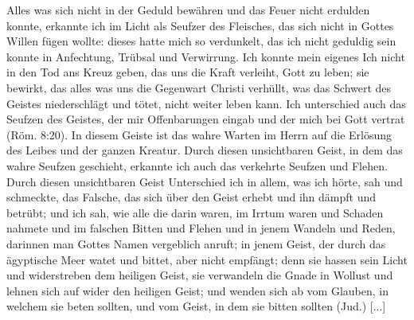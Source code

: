 Alles was sich nicht in der Geduld bewähren und das Feuer
nicht erdulden konnte, erkannte ich im Licht als Seufzer des
Fleisches, das sich nicht in Gottes Willen fügen wollte: dieses
hatte mich so verdunkelt, das ich nicht geduldig sein konnte in
Anfechtung, Trübsal und Verwirrung. Ich konnte mein eigenes
Ich nicht in den Tod ans Kreuz geben, das uns die Kraft
verleiht, Gott zu leben; sie bewirkt, das alles was uns
die Gegenwart Christi verhüllt, was das Schwert des Geistes
niederschlägt und tötet, nicht weiter leben kann. Ich 
unterschied auch das Seufzen des Geistes, der mir Offenbarungen
eingab und der mich bei Gott vertrat 
(Röm. 8:20). In diesem
Geiste ist das wahre Warten im Herrn 
auf die Erlösung des
Leibes und der ganzen Kreatur. Durch diesen unsichtbaren Geist,
in dem das wahre Seufzen geschieht, erkannte ich auch das 
verkehrte Seufzen und Flehen. Durch diesen unsichtbaren Geist
Unterschied ich in allem, was ich hörte, sah und schmeckte, das
Falsche, das sich über den Geist erhebt und ihn dämpft und
betrübt; und ich sah, wie alle die darin waren, im Irrtum waren
und Schaden nahmete und im falschen Bitten und Flehen und in
jenem Wandeln und Reden, darinnen man Gottes Namen 
vergeblich anruft; in jenem Geist, der durch das ägyptische Meer
watet und bittet, aber nicht empfängt; denn sie hassen sein
Licht und widerstreben dem heiligen Geist, sie verwandeln die
Gnade in Wollust und lehnen sich auf wider den heiligen Geist;
und wenden sich ab vom Glauben, in welchem sie beten sollten,
und vom Geist, in dem sie bitten sollten (Jud.) [...]

